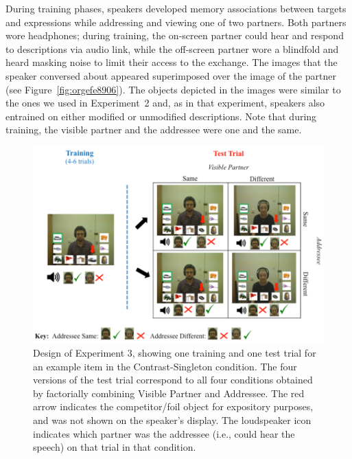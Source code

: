 \documentclass[natbib,man,a4paper]{apa6}
\begin{document}
During training phases, speakers developed memory associations between targets and expressions while addressing and viewing one of two partners. Both partners wore headphones; during training, the on-screen partner could hear and respond to descriptions via audio link, while the off-screen partner wore a blindfold and heard masking noise to limit their access to the exchange.  The images that the speaker conversed about appeared superimposed over the image of the partner (see Figure~\ref{fig:orgefe8906}). The objects depicted in the images were similar to the ones we used in Experiment~2 and, as in that experiment, speakers also entrained on either modified or unmodified descriptions. Note that during training, the visible partner and the addressee were one and the same.

\begin{figure}[htbp]
\centering
\includegraphics[width=.9\linewidth]{figs/Exp3_overview.png}
\caption{\label{fig:orgb408182}
Design of Experiment 3, showing one training and one test trial for an example item in the Contrast-Singleton condition. The four versions of the test trial correspond to all four conditions obtained by factorially combining Visible Partner and Addressee. The red arrow indicates the competitor/foil object for expository purposes, and was not shown on the speaker's display.  The loudspeaker icon indicates which partner was the addressee (i.e., could hear the speech) on that trial in that condition.}
\end{figure}
\end{document}
